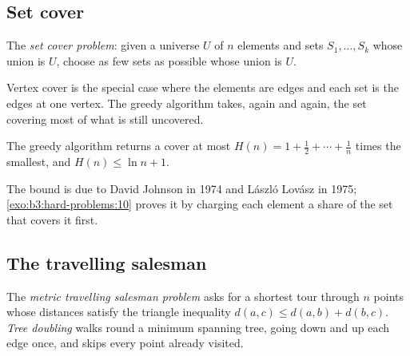 \subsection{Set cover}

\begin{definition}\label{def:b3:hard-problems:set-cover}
The \emph{set cover problem}: given a universe $U$ of $n$ elements and sets $S_1, \ldots, S_k$ whose union is $U$, choose as few sets as possible whose union is $U$.
\end{definition}

Vertex cover is the special case where the elements are edges and each set is the edges at one vertex. The greedy algorithm takes, again and again, the set covering most of what is still uncovered.

\label{lst:b3:hard-problems:set-cover}

\begin{theorem}\label{thm:b3:hard-problems:set-cover}
The greedy algorithm returns a cover at most $H(n) = 1 + \frac{1}{2} + \cdots + \frac{1}{n}$ times the smallest, and $H(n) \le \ln n + 1$.
\end{theorem}

The bound is due to David Johnson in 1974 and L\'aszl\'o Lov\'asz in 1975; \cref{exo:b3:hard-problems:10} proves it by charging each element a share of the set that covers it first. %

\label{out:b3:hard-problems:set-cover}

\subsection{The travelling salesman}

\begin{definition}\label{def:b3:hard-problems:tsp}
The \emph{metric travelling salesman problem} asks for a shortest tour through $n$ points whose distances satisfy the triangle inequality $d(a, c) \le d(a, b) + d(b, c)$. \emph{Tree doubling} walks round a minimum spanning tree, going down and up each edge once, and skips every point already visited.
\end{definition}

